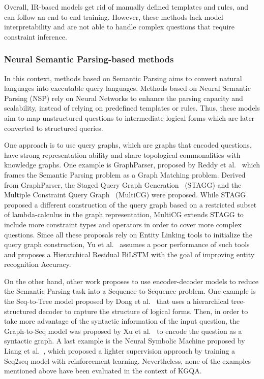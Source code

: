 Overall, IR-based models get rid of manually defined templates and rules, and can follow an 
end-to-end training. However, these methods lack model interpretability and are not able to 
handle complex questions that require constraint inference.

\subsubsection{Neural Semantic Parsing-based methods}
\label{cap2:theoFrame/qakg/approaches/neuSemParsing}
In this context, methods based on Semantic Parsing aims to convert natural languages into 
executable query languages. Methods based on Neural Semantic Parsing (NSP) rely on Neural 
Networks to enhance the parsing capacity and scalability, instead of relying on predefined 
templates or rules. Thus, these models aim to map unstructured questions to intermediate 
logical forms which are later converted to structured queries.

One approach is to use query graphs, which are graphs that encoded questions, have strong 
representation ability and share topological commonalities with knowledge graphs. One example 
is GraphParser, proposed by Reddy et al.~\cite{qa:ReddyLS14} which frames the Semantic Parsing 
problem as a Graph Matching problem. Derived from GraphParser, the Staged Query Graph 
Generation~\cite{qa:YihCHG15} (STAGG) and the Multiple Constraint Query Graph~\cite{qa:BaoDYZZ16} 
(MultiCG) were proposed. While STAGG proposed a different construction of the query graph based 
on a restricted subset of lambda-calculus in the graph representation, MultiCG extends STAGG to 
include more constraint types and operators in order to cover more complex questions. Since all 
these proposals rely on Entity Linking tools to initialize the query graph construction, 
Yu et al.~\cite{qa:YuYHSXZ17} assumes a poor performance of such tools and proposes a 
Hierarchical Residual BiLSTM with the goal of improving entity recognition Accuracy.

On the other hand, other work proposes to use encoder-decoder models to reduce the Semantic 
Parsing task into a Sequence-to-Sequence problem. One example is the Seq-to-Tree model proposed 
by Dong et al.~\cite{nmt:DongL16} that uses a hierarchical tree-structured decoder to capture 
the structure of logical forms. Then, in order to take more advantage of the syntactic 
information of the input question, the Graph-to-Seq model was proposed by Xu et al.~\cite{qa:XuWWYCS18} 
to encode the question as a syntactic graph. A last example is the Neural Symbolic Machine 
proposed by Liang et al.~\cite{qa:LiangBLFL17}, which proposed a lighter supervision approach 
by training a Seq2seq model with reinforcement learning. Nevertheless, none of the examples 
mentioned above have been evaluated in the context of KGQA.

